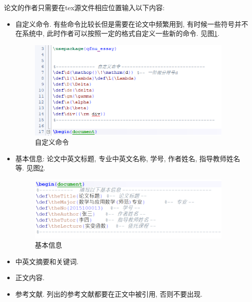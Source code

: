 论文的作者只需要在tex源文件相应位置输入以下内容:
\begin{itemize}
  \item 自定义命令. 有些命令比较长但是需要在论文中频繁用到, 有时候一些符号并不在系统中, 此时作者可以按照一定的格式自定义一些新的命令. 见图\ref{pic: redefine}.
\begin{figure}
\centering
\includegraphics[width =4in]{Img/redefine.png}
\caption{自定义命令}   %
\label{pic: redefine} %
\end{figure}
  \item 基本信息: 论文中英文标题, 专业中英文名称, 学号, 作者姓名, 指导教师姓名等.  见图\ref{pic: basic-info}.
\begin{figure}
\centering
\includegraphics[width =4in]{Img/basic-info.png}
\caption{基本信息}   %
\label{pic: basic-info} %
\end{figure}
  \item 中英文摘要和关键词.
  \item 正文内容.
  \item 参考文献. 列出的参考文献都要在正文中被引用, 否则不要出现.
\end{itemize}

